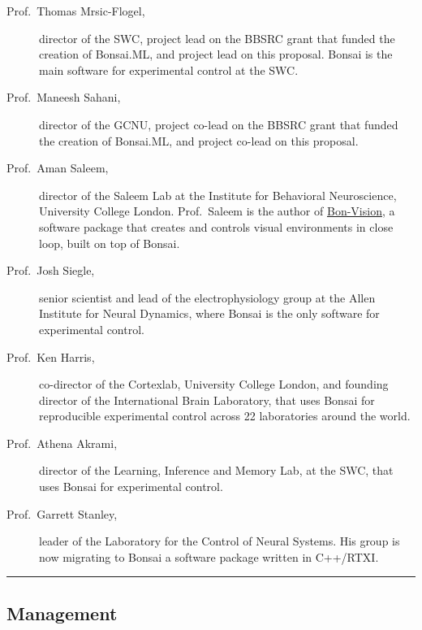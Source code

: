 \begin{description}

    \item[Prof.~Thomas Mrsic-Flogel,] director of the SWC, project lead on the
        BBSRC grant that funded the creation of Bonsai.ML, and project lead on
        this proposal. Bonsai is the main software for experimental control at
        the SWC.

    \item[Prof.~Maneesh Sahani,] director of the GCNU, project co-lead on the
        BBSRC grant that funded the creation of Bonsai.ML, and project co-lead
        on this proposal.

    \item[Prof.~Aman Saleem,] director of the Saleem Lab at the Institute for
        Behavioral Neuroscience, University College London. Prof.~Saleem is the
        author of \href{https://bonvision.github.io/}{Bon-Vision}, a software
        package that creates and controls visual environments in close loop,
        built on top of Bonsai.

    \item[Prof.~Josh Siegle,] senior scientist and lead of the
        electrophysiology group at the Allen Institute for Neural Dynamics,
        where Bonsai is the only software for experimental control.

    \item[Prof.~Ken Harris,] co-director of the Cortexlab, University College
        London, and founding director of the International Brain Laboratory,
        that uses Bonsai for reproducible experimental control across 22
        laboratories around the world.

    \item[Prof.~Athena Akrami,] director of the Learning, Inference and Memory
        Lab, at the SWC, that uses Bonsai for experimental control.

    \item[Prof.~Garrett Stanley,] leader of the Laboratory for the Control of
        Neural Systems. His group is now migrating to Bonsai a software package
        written in C++/RTXI.

\end{description}

\noindent\rule{\textwidth}{1pt}
\subsection*{Management}

